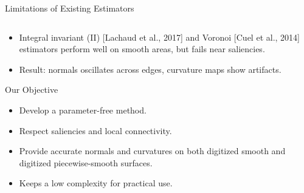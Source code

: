 \documentclass[11pt]{beamer}
\begin{document}
\begin{frame}{Limitations of Existing Estimators}
\begin{columns}
        \end{columns}
        \vspace{0.3cm}
        \begin{itemize}
            \item Integral invariant (II) [Lachaud et al., 2017] and Voronoi [Cuel et al., 2014] estimators perform well on smooth areas,
            but fails near saliencies.
            \item Result: normals oscillates across edges, curvature maps show artifacts.
        \end{itemize}
    \end{frame}
    \begin{frame}{Our Objective}
        \begin{itemize}
            \item Develop a parameter-free method.
            \item Respect saliencies and local connectivity.
            \item Provide accurate normals and curvatures on both digitized smooth and digitized piecewise-smooth surfaces.
            \item Keeps a low complexity for practical use.
        \end{itemize}
    \end{frame}
\end{document}
